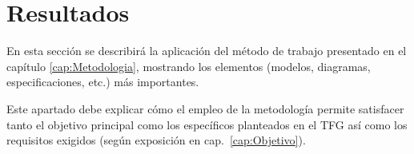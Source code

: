 \chapter{Resultados}
\label{cap:Resultados}

En esta sección se describirá la aplicación del método de trabajo presentado en el capítulo \ref{cap:Metodologia},  mostrando los elementos (modelos, diagramas, especificaciones, etc.) más importantes. 

Este apartado debe explicar cómo el empleo de la metodología permite satisfacer tanto el objetivo principal como los específicos planteados en el TFG así como los requisitos exigidos (según exposición en cap.~\ref{cap:Objetivo}).